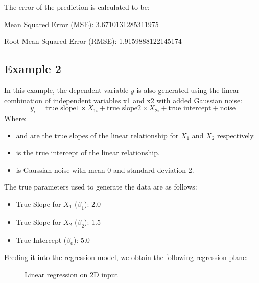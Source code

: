 \documentclass{article}
\begin{document}
The error of the prediction is calculated to be:

Mean Squared Error (MSE): 3.6710131285311975

Root Mean Squared Error (RMSE): 1.9159888122145174

\subsection{Example 2}

In this example, the dependent variable \( y \) is also generated using the linear combination of independent variables x1 and x2 with added Gaussian noise:
\[
y_i = \text{{true\_slope1}} \times X_{1i} + \text{{true\_slope2}} \times X_{2i} + \text{{true\_intercept}} + \text{{noise}}
\]
Where:
\begin{itemize}
    \item {} and  are the true slopes of the linear relationship for \( X_1 \) and \( X_2 \) respectively.
    \item {} is the true intercept of the linear relationship.
    \item {} is Gaussian noise with mean 0 and standard deviation 2.
\end{itemize}

The true parameters used to generate the data are as follows:
\begin{itemize}
    \item True Slope for \( X_1 \) (\( \beta_1 \)): \( 2.0 \)
    \item True Slope for \( X_2 \) (\( \beta_2 \)): \( 1.5 \)
    \item True Intercept (\( \beta_0 \)): \( 5.0 \)
\end{itemize}

Feeding it into the regression model, we obtain the following regression plane:

\begin{figure}[H]
    \centering
    \caption{Linear regression on 2D input}
    \label{fig:example}
\end{figure}
\end{document}
